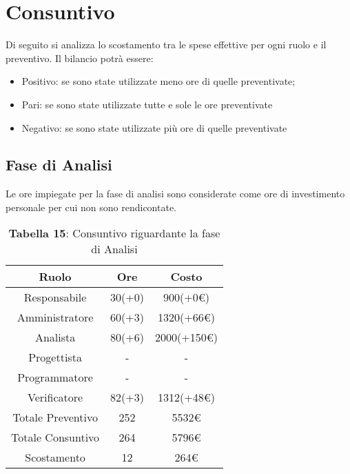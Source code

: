 \section{Consuntivo}
Di seguito si analizza lo scostamento tra le spese effettive per ogni ruolo e il preventivo. Il bilancio potrà essere:
\begin{itemize}
	\item Positivo: se sono state utilizzate meno ore di quelle preventivate;
	\item Pari: se sono state utilizzate tutte e sole le ore preventivate
	\item Negativo: se sono state utilizzate più ore di quelle preventivate
\end{itemize}
\subsection{Fase di Analisi}
Le ore impiegate per la fase di analisi sono considerate come ore di investimento personale per cui non sono rendicontate.
\begin{table}[H]
	\centering
	\renewcommand{\arraystretch}{1.5}
	\begin{tabular}{|c|c|c|}
		\hline
		\rowcolor{lighter-grayer}
		Ruolo & Ore & Costo \\
		\hline
		Responsabile & 30(+0) & 900(+0\euro) \\
		\hline
		Amministratore & 60(+3) & 1320(+66\euro)  \\
		\hline
		Analista &  80(+6) & 2000(+150\euro)  \\
		\hline
		Progettista& - & - \\
		\hline
		Programmatore & - & - \\
		\hline
		Verificatore & 82(+3) & 1312(+48\euro) \\
		\hline
		Totale Preventivo & 252 & 5532\euro \\
		\hline
		Totale Consuntivo & 264 & 5796\euro \\
		\hline
		Scostamento & 12 & 264\euro \\
		\hline
	\end{tabular}
	\caption*{\textbf{Tabella 15}: Consuntivo riguardante la fase di Analisi\\}
\end{table}
